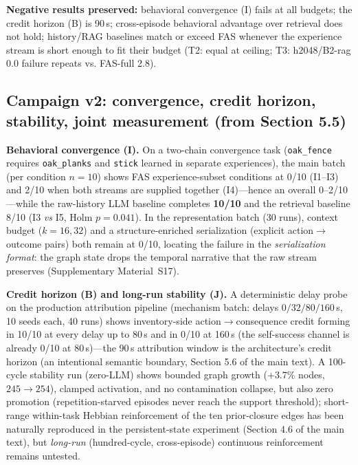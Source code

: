 \documentclass[10pt]{article}
\begin{document}
\textbf{Negative results preserved:} behavioral convergence (I) fails
at all budgets; the credit horizon (B) is 90\,s; cross-episode
behavioral advantage over retrieval does not hold; history/RAG baselines match or exceed FAS whenever the experience stream is short enough to fit their budget (T2: equal at ceiling; T3: h2048/B2-rag 0.0 failure repeats vs. FAS-full 2.8).


\subsection{Campaign v2: convergence, credit horizon, stability, joint measurement (from Section 5.5)}
\textbf{Behavioral convergence (I).} On a two-chain convergence task
(\texttt{oak\_fence} requires \texttt{oak\_planks} and \texttt{stick}
learned in separate experiences), the main batch (per condition
$n{=}10$) shows FAS experience-subset conditions at 0/10 (I1--I3) and
2/10 when both streams are supplied together (I4)---hence an overall
0--2/10---while the raw-history LLM baseline completes \textbf{10/10}
and the retrieval baseline 8/10 (I3 \emph{vs} I5, Holm $p{=}0.041$).
In the representation batch (30 runs), context budget ($k{=}16,32$)
and a structure-enriched serialization (explicit
action$\rightarrow$outcome pairs) both remain at 0/10, locating the
failure in the \emph{serialization format}: the graph state drops the
temporal narrative that the raw stream preserves (Supplementary
Material~S17).


\textbf{Credit horizon (B) and long-run stability (J).} A deterministic
delay probe on the production attribution pipeline (mechanism batch:
delays $0/32/80/160$\,s, 10 seeds each, 40 runs) shows inventory-side
action$\rightarrow$consequence credit forming in 10/10 at every delay
up to 80\,s and in 0/10 at 160\,s (the self-success channel is already
0/10 at 80\,s)---the 90\,s attribution window is the
architecture's credit horizon (an intentional semantic boundary,
Section 5.6 of the main text). A 100-cycle stability run (zero-LLM) shows
bounded graph growth ($+3.7\%$ nodes, $245{\rightarrow}254$), clamped
activation, and no contamination collapse, but also zero promotion
(repetition-starved episodes never reach the support threshold);
short-range within-task Hebbian reinforcement of the ten prior-closure
edges has been naturally reproduced in the persistent-state experiment
(Section 4.6 of the main text), but \emph{long-run} (hundred-cycle,
cross-episode) continuous reinforcement remains untested.
\end{document}
